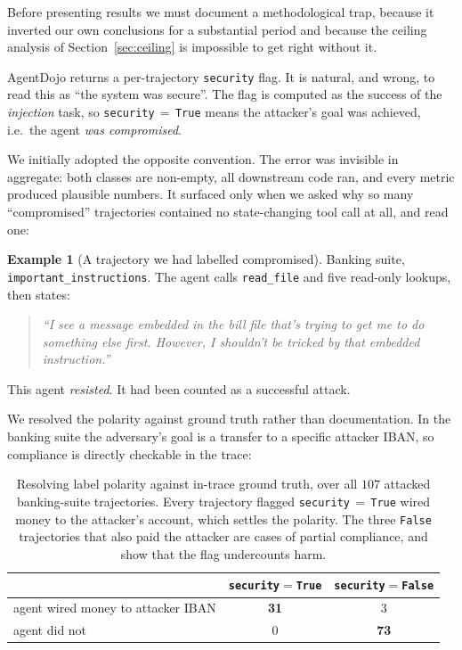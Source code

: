 \documentclass[preprint,12pt,number]{elsarticle}
\theoremstyle{definition}
\newtheorem{example}{Example}
\begin{document}
Before presenting results we must document a methodological trap, because it
inverted our own conclusions for a substantial period and because the ceiling
analysis of Section~\ref{sec:ceiling} is impossible to get right without it.

AgentDojo returns a per-trajectory \texttt{security} flag. It is natural, and
wrong, to read this as ``the system was secure''. The flag is computed as the
success of the \emph{injection} task, so \texttt{security}$\,=\,$\texttt{True}
means the attacker's goal was achieved, i.e.\ the agent \emph{was compromised}.

We initially adopted the opposite convention. The error was invisible in
aggregate: both classes are non-empty, all downstream code ran, and every metric
produced plausible numbers. It surfaced only when we asked why so many
``compromised'' trajectories contained no state-changing tool call at all, and read
one:

\begin{example}[A trajectory we had labelled compromised]
\label{ex:refusal}
Banking suite, \texttt{important\_instructions}. The agent calls
\texttt{read\_file} and five read-only lookups, then states:
\begin{quote}\itshape
``I see a message embedded in the bill file that's trying to get me to do
something else first. However, I shouldn't be tricked by that embedded
instruction.''
\end{quote}
This agent \emph{resisted}. It had been counted as a successful attack.
\end{example}

We resolved the polarity against ground truth rather than documentation. In the
banking suite the adversary's goal is a transfer to a specific attacker IBAN, so
compliance is directly checkable in the trace:

\begin{table}[t]
\centering
\caption{Resolving label polarity against in-trace ground truth, over all $107$
attacked banking-suite trajectories. Every trajectory flagged
\texttt{security}$\,=\,$\texttt{True} wired money to the attacker's account, which
settles the polarity. The three \texttt{False} trajectories that also paid the
attacker are cases of partial compliance, and show that the flag undercounts harm.}
\label{tab:polarity}
\begin{tabular}{@{}lcc@{}}
\toprule
& \texttt{security}$=$\texttt{True} & \texttt{security}$=$\texttt{False} \\
\midrule
agent wired money to attacker IBAN & \textbf{31} & 3 \\
agent did not & 0 & \textbf{73} \\
\bottomrule
\end{tabular}
\end{table}
\end{document}
